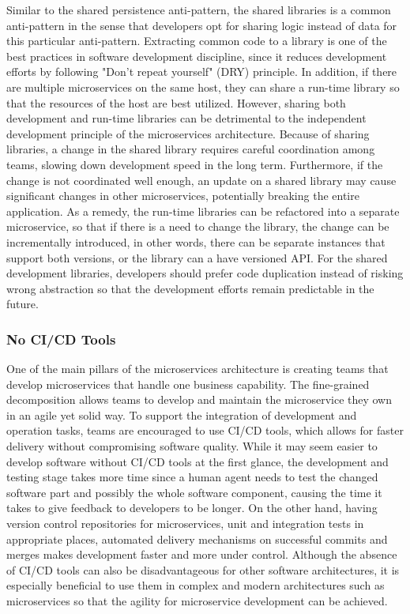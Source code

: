 \documentclass{Configuration_Files/PoliMi3i_thesis}
\begin{document}
Similar to the shared persistence anti-pattern, the shared libraries is a common anti-pattern in the sense that developers opt for sharing logic instead of data for this particular anti-pattern.
Extracting common code to a library is one of the best practices in software development discipline, since it reduces development efforts by following "Don't repeat yourself" (DRY) principle.
In addition, if there are multiple microservices on the same host, they can share a run-time library so that the resources of the host are best utilized.
However, sharing both development and run-time libraries can be detrimental to the independent development principle of the microservices architecture.
Because of sharing libraries, a change in the shared library requires careful coordination among teams, slowing down development speed in the long term. Furthermore, if the change is not coordinated well enough, an update on a shared library may cause significant changes in other microservices, potentially breaking the entire application.
As a remedy, the run-time libraries can be refactored into a separate microservice, so that if there is a need to change the library, the change can be incrementally introduced, in other words, there can be separate instances that support both versions, or the library can a have versioned API.
For the shared development libraries, developers should prefer code duplication instead of risking wrong abstraction so that the development efforts remain predictable in the future.

\subsubsection{No CI/CD Tools}
\label{subsubsec:no_cicd}

One of the main pillars of the microservices architecture is creating teams that develop microservices that handle one business capability.
The fine-grained decomposition allows teams to develop and maintain the microservice they own in an agile yet solid way.
To support the integration of development and operation tasks, teams are encouraged to use CI/CD tools, which allows for faster delivery without compromising software quality.
While it may seem easier to develop software without CI/CD tools at the first glance, the development and testing stage takes more time since a human agent needs to test the changed software part and possibly the whole software component, causing the time it takes to give feedback to developers to be longer.
On the other hand, having version control repositories for microservices, unit and integration tests in appropriate places, automated delivery mechanisms on successful commits and merges makes development faster and more under control.
Although the absence of CI/CD tools can also be disadvantageous for other software architectures, it is especially beneficial to use them in complex and modern architectures such as microservices so that the agility for microservice development can be achieved.
\end{document}
